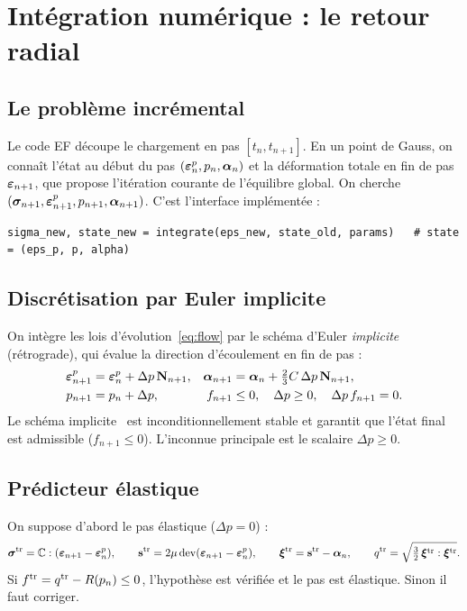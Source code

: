 \section{Intégration numérique : le retour radial}\label{sec:integration}

\subsection{Le problème incrémental}

Le code EF découpe le chargement en pas $[t_n,t_{n+1}]$. En un point de Gauss, on connaît l'état au début du pas $(\boldsymbol{\varepsilon}^{p}_n, p_n, \boldsymbol{\alpha}_n)$ et la déformation totale en fin de pas $\boldsymbol{\varepsilon}_{n+1}$, que propose l'itération courante de l'équilibre global. On cherche $(\boldsymbol{\sigma}_{n+1},\boldsymbol{\varepsilon}^{p}_{n+1},p_{n+1},\boldsymbol{\alpha}_{n+1})$. C'est l'interface implémentée :
\begin{lstlisting}
sigma_new, state_new = integrate(eps_new, state_old, params)   # state = (eps_p, p, alpha)
\end{lstlisting}

\subsection{Discrétisation par Euler implicite}

On intègre les lois d'évolution~\eqref{eq:flow} par le schéma d'Euler \emph{implicite} (rétrograde), qui évalue la direction d'écoulement en fin de pas :
\begin{align}
\boldsymbol{\varepsilon}^{p}_{n+1} &= \boldsymbol{\varepsilon}^{p}_n + \Delta p\,\mathbf{N}_{n+1}, & \boldsymbol{\alpha}_{n+1} &= \boldsymbol{\alpha}_n + \tfrac23 C\,\Delta p\,\mathbf{N}_{n+1},\\
p_{n+1} &= p_n+\Delta p, & f_{n+1} &\le 0,\quad \Delta p\ge0,\quad \Delta p\,f_{n+1}=0.
\end{align}
Le schéma implicite~\cite{simo1998,desouza2008} est inconditionnellement stable et garantit que l'état final est admissible ($f_{n+1}\le0$). L'inconnue principale est le scalaire $\Delta p\ge0$.

\subsection{Prédicteur élastique}

On suppose d'abord le pas élastique ($\Delta p=0$) :
\begin{equation}
\boldsymbol{\sigma}^{\mathrm{tr}} = \mathbb{C}:(\boldsymbol{\varepsilon}_{n+1}-\boldsymbol{\varepsilon}^{p}_n),\qquad \mathbf{s}^{\mathrm{tr}} = 2\mu\operatorname{dev}(\boldsymbol{\varepsilon}_{n+1}-\boldsymbol{\varepsilon}^{p}_n),\qquad \boldsymbol{\xi}^{\mathrm{tr}} = \mathbf{s}^{\mathrm{tr}}-\boldsymbol{\alpha}_n,\qquad q^{\mathrm{tr}} = \sqrt{\tfrac32\,\boldsymbol{\xi}^{\mathrm{tr}}:\boldsymbol{\xi}^{\mathrm{tr}}}.
\end{equation}
Si $f^{\mathrm{tr}} = q^{\mathrm{tr}} - R(p_n)\le0$, l'hypothèse est vérifiée et le pas est élastique. Sinon il faut corriger.

